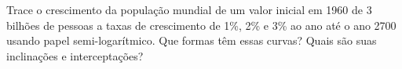 Trace o crescimento da população mundial de um valor inicial em 1960 de 3 bilhões de pessoas a taxas de crescimento de 1\%, 2\% e 3\% ao ano até o ano 2700 usando papel semi-logarítmico. Que formas têm essas curvas? Quais são suas inclinações e interceptações?
